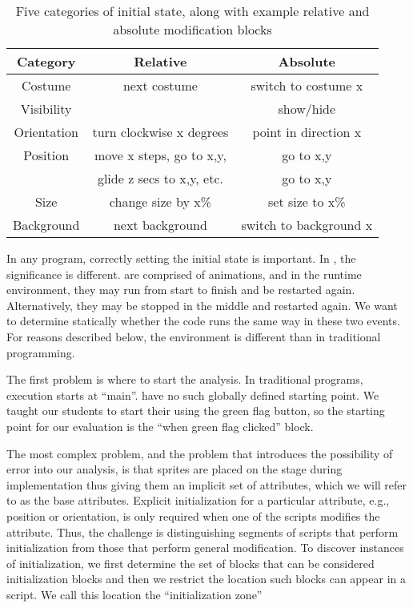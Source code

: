 \begin{table}
\centering
\begin{tabular}{|c|c|c|} \hline
Category & Relative&Absolute\\ \hline \hline
Costume& next costume & switch to costume x\\ \hline
Visibility& & show/hide\\ \hline
Orientation&turn clockwise x degrees&point in direction x\\ \hline
Position&move x steps, go to x,y,&go to x,y\\
&glide z secs to x,y, etc.&go to x,y\\ \hline
Size&change size by x\% & set size to x\%\\ \hline
Background&next background & switch to background x\\ \hline
\end{tabular}
\caption{Five categories of initial state, along with example relative and
  absolute modification blocks}
\end{table}


In any program, correctly setting the initial state is important.  In
, the significance is different.   are comprised of
animations, and in the runtime environment, they may run from start to finish
and be restarted again.  Alternatively, they may be stopped in the middle and
restarted again.  We want to determine statically whether the code runs the
same way in these two events.  For reasons described below, the environment is
different than in traditional programming.

The first problem is where to start the analysis.  In traditional programs,
execution starts at ``main''.   have no such globally defined
starting point.  We taught our students to start their \sprogram{} using the
green flag button, so the starting point for our evaluation is the ``when green
flag clicked'' block.

The most complex problem, and the problem that introduces the possibility of
error into our analysis, is that sprites are placed on the stage during
implementation thus giving them an implicit set of attributes, which we will
refer to as the base attributes. Explicit initialization for a particular
attribute, e.g., position or orientation, is only required when one of the
 scripts modifies the attribute. Thus, the challenge is
distinguishing segments of scripts that perform initialization from those that
perform general modification. To discover instances of initialization, we first
determine the set of blocks that can be considered initialization blocks and
then we restrict the location such blocks can appear in a script. We call this
location the ``initialization zone''

